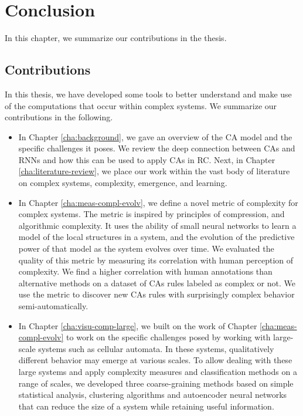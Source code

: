 \chapter{Conclusion}\label{cha:conclusion}

In this chapter, we summarize our contributions in the thesis.

\section{Contributions}

In this thesis, we have developed some tools to better understand and make use
of the computations that occur within complex systems.
We summarize our contributions in the following.

\begin{itemize}
  \item In Chapter \ref{cha:background}, we gave an overview of the \acf{CA}
        model and the specific challenges it poses. We review the deep
        connection between \acp{CA} and \acfp{RNN} and how this can be used to apply
        \acp{CA} in \acf{RC}. Next, in Chapter \ref{cha:literature-review}, we
        place our work within the vast body of literature on complex systems,
        complexity, emergence, and learning.

  \item In Chapter \ref{cha:meas-compl-evolv}, we define a novel metric of
        complexity for complex systems. The metric is inspired by principles of
        compression, and algorithmic complexity. It uses the ability of small
        neural networks to learn a model of the local structures in a system,
        and the evolution of the predictive power of that model as the system
        evolves over time. We evaluated the quality of this metric by measuring
        its correlation with human perception of complexity. We find a
        higher correlation with human annotations than alternative methods on a
        dataset of \acp{CA} rules labeled as complex or not. We use the metric
        to discover new \acp{CA} rules with surprisingly complex behavior
        semi-automatically.

  \item In Chapter \ref{cha:visu-comp-large}, we built on the work of Chapter
        \ref{cha:meas-compl-evolv} to work on the specific challenges posed by
        working with large-scale systems such as cellular automata. In these
        systems, qualitatively different behavior may emerge at various scales.
        To allow dealing with these large systems and apply complexity measures
        and classification methods on a range of scales, we developed three
        coarse-graining methods based on simple statistical analysis, clustering
        algorithms and autoencoder neural networks that can reduce the size of
        a system while retaining useful information.


\end{itemize}
